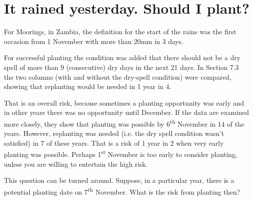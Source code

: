 \documentclass[
  letterpaper,
  DIV=11,
  numbers=noendperiod]{scrreprt}
\begin{document}
\section{It rained yesterday. Should I
plant?}\label{it-rained-yesterday.-should-i-plant}

For Moorings, in Zambia, the definition for the start of the rains was
the first occasion from 1 November with more than 20mm in 3 days.

For successful planting the condition was added that there should not be
a dry spell of more than 9 (consecutive) dry days in the next 21 days.
In Section 7.3 the two columns (with and without the dry-spell
condition) were compared, showing that replanting would be needed in 1
year in 4.

That is an overall risk, because sometimes a planting opportunity was
early and in other years there was no opportunity until December. If the
data are examined more closely, they show that planting was possible by
6\textsuperscript{th} November in 14 of the years. However, replanting
was needed (i.e. the dry spell condition wasn't satisfied) in 7 of these
years. That is a risk of 1 year in 2 when very early planting was
possible. Perhaps 1\textsuperscript{st} November is too early to
consider planting, unless you are willing to entertain the high risk.

This question can be turned around. Suppose, in a particular year, there
is a potential planting date on 7\textsuperscript{th} November. What is
the risk from planting then?
\end{document}
